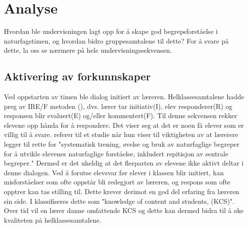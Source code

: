 \documentclass[main.tex]{subfiles}
\begin{document}
\section*{Analyse}
\label{sec:2}

Hvordan ble undervisningen lagt opp for å skape god begrepsforståelse i naturfagstimen, og hvordan 
bidro gruppesamtalene til dette? For å svare på dette, la oss se nærmere på hele 
undervisningssekvensen.


\subsection*{Aktivering av forkunnskaper}
Ved oppstarten av timen ble dialog initiert av læreren. Helklassesamtalene hadde preg av
IRE/F metoden (), dvs. lærer tar initiativ(I), elev responderer(R) og responsen blir 
evaluert(E) og/eller kommentert(F). Til denne sekvensen rekker elevene opp hånda for å respondere. 
Det viser seg at det er noen få elever som er villig til å svare.  referer til 
et studie når hun viser til viktigheten av at lærerere legger til rette for "systematisk 
trening, øvelse og bruk av naturfaglige begreper for å utvikle elevenes naturfaglige forståelse, 
inkludert repitisjon av sentrale begreper." Dermed er det uheldig at det flerparten av elevene
ikke aktivt deltar i denne dialogen.
\newline
\newline
Ved å forutse elevsvar før elever i klassen blir initiert, kan misforståelser som 
ofte oppstår bli redegjort av læreren, og respons som ofte opptrer kan tas stilling til. Dette krever 
derimot en god del erfaring fra læreren sin side. I  klassifiseres dette som 
"knowledge of content and students, (KCS)". Over tid vil en lærer danne omfattende KCS og dette 
kan dermed bidra til å øke kvaliteten på helklassesamtalene. 
\end{document}
